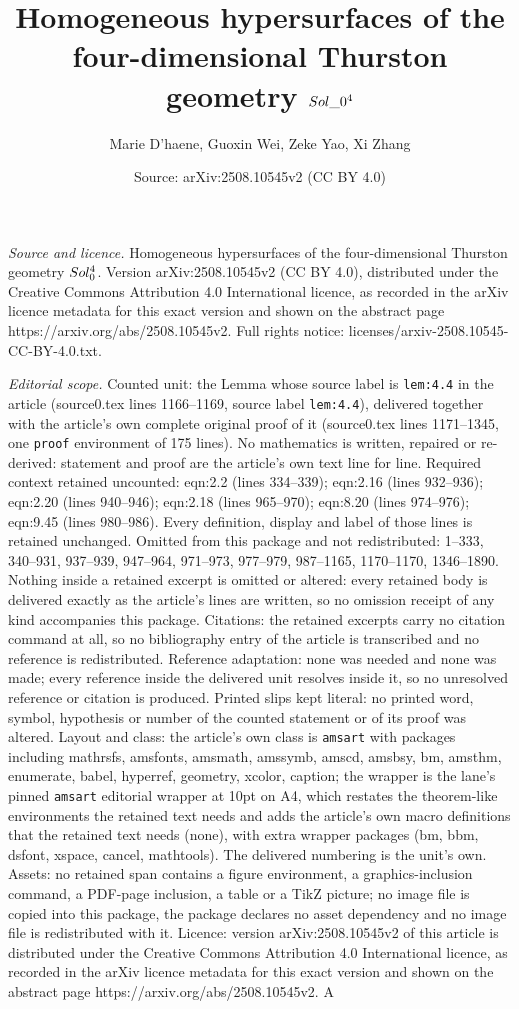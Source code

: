 \documentclass[10pt,a4paper]{amsart}
\title[Homogeneous hypersurfaces of the four-dimensional Thurston g]{Homogeneous hypersurfaces of the four-dimensional Thurston geometry ${\rm Sol\_0^4}$}
\author{Marie D'haene, Guoxin Wei, Zeke Yao, Xi Zhang}
\date{Source: arXiv:2508.10545v2 (CC BY 4.0)}
\begin{document}
\maketitle

\noindent\emph{Source and licence.} Homogeneous hypersurfaces of the four-dimensional Thurston geometry ${\rm Sol_0^4}$. Version arXiv:2508.10545v2 (CC BY 4.0), distributed under the Creative Commons Attribution 4.0 International licence, as recorded in the arXiv licence metadata for this exact version and shown on the abstract page https://arxiv.org/abs/2508.10545v2. Full rights notice: licenses/arxiv-2508.10545-CC-BY-4.0.txt.\par\smallskip

\noindent\textit{Editorial scope.} Counted unit: the Lemma whose source label is \texttt{lem:4.4} in the article (source0.tex lines 1166--1169, source label \texttt{lem:4.4}), delivered together with the article's own complete original proof of it (source0.tex lines 1171--1345, one \texttt{proof} environment of 175 lines). No mathematics is written, repaired or re-derived: statement and proof are the article's own text line for line. Required context retained uncounted: eqn:2.2 (lines 334--339); eqn:2.16 (lines 932--936); eqn:2.20 (lines 940--946); eqn:2.18 (lines 965--970); eqn:8.20 (lines 974--976); eqn:9.45 (lines 980--986). Every definition, display and label of those lines is retained unchanged. Omitted from this package and not redistributed: 1--333, 340--931, 937--939, 947--964, 971--973, 977--979, 987--1165, 1170--1170, 1346--1890. Nothing inside a retained excerpt is omitted or altered: every retained body is delivered exactly as the article's lines are written, so no omission receipt of any kind accompanies this package. Citations: the retained excerpts carry no citation command at all, so no bibliography entry of the article is transcribed and no reference is redistributed. Reference adaptation: none was needed and none was made; every reference inside the delivered unit resolves inside it, so no unresolved reference or citation is produced. Printed slips kept literal: no printed word, symbol, hypothesis or number of the counted statement or of its proof was altered. Layout and class: the article's own class is \texttt{amsart} with packages including mathrsfs, amsfonts, amsmath, amssymb, amscd, amsbsy, bm, amsthm, enumerate, babel, hyperref, geometry, xcolor, caption; the wrapper is the lane's pinned \texttt{amsart} editorial wrapper at 10pt on A4, which restates the theorem-like environments the retained text needs and adds the article's own macro definitions that the retained text needs (none), with extra wrapper packages (bm, bbm, dsfont, xspace, cancel, mathtools). The delivered numbering is the unit's own. Assets: no retained span contains a figure environment, a graphics-inclusion command, a PDF-page inclusion, a table or a TikZ picture; no image file is copied into this package, the package declares no asset dependency and no image file is redistributed with it. Licence: version arXiv:2508.10545v2 of this article is distributed under the Creative Commons Attribution 4.0 International licence, as recorded in the arXiv licence metadata for this exact version and shown on the abstract page https://arxiv.org/abs/2508.10545v2. A 
\end{document}
